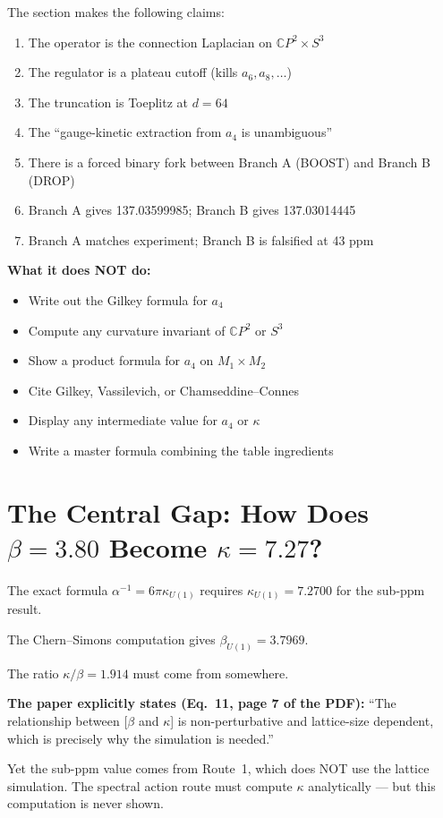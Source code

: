 \documentclass[12pt,a4paper]{article}
\begin{document}
The section makes the following claims:
\begin{enumerate}
\item The operator is the connection Laplacian on $\mathbb{C}P^2 \times S^3$
\item The regulator is a plateau cutoff (kills $a_6, a_8, \ldots$)
\item The truncation is Toeplitz at $d = 64$
\item The ``gauge-kinetic extraction from $a_4$ is unambiguous''
\item There is a forced binary fork between Branch A (BOOST) and Branch B (DROP)
\item Branch A gives 137.03599985; Branch B gives 137.03014445
\item Branch A matches experiment; Branch B is falsified at 43 ppm
\end{enumerate}

\textbf{What it does NOT do:}
\begin{itemize}
\item Write out the Gilkey formula for $a_4$
\item Compute any curvature invariant of $\mathbb{C}P^2$ or $S^3$
\item Show a product formula for $a_4$ on $M_1 \times M_2$
\item Cite Gilkey, Vassilevich, or Chamseddine--Connes
\item Display any intermediate value for $a_4$ or $\kappa$
\item Write a master formula combining the table ingredients
\end{itemize}

\section{The Central Gap: How Does $\beta = 3.80$ Become $\kappa = 7.27$?}
\label{sec:gap}

\begin{tcolorbox}[colback=orange!5!white, colframe=orange!60!black,
  title=The Missing Step]
The exact formula $\alpha^{-1} = 6\pi\kappa_{U(1)}$ requires
$\kappa_{U(1)} = 7.2700$ for the sub-ppm result.

The Chern--Simons computation gives $\beta_{U(1)} = 3.7969$.

The ratio $\kappa/\beta = 1.914$ must come from somewhere.

\textbf{The paper explicitly states (Eq.~11, page 7 of the PDF):}
``The relationship between [$\beta$ and $\kappa$] is non-perturbative
and lattice-size dependent, which is precisely why the simulation
is needed.''

Yet the sub-ppm value comes from Route~1, which does NOT use the
lattice simulation. The spectral action route must compute
$\kappa$ analytically --- but this computation is never shown.
\end{tcolorbox}
\end{document}
